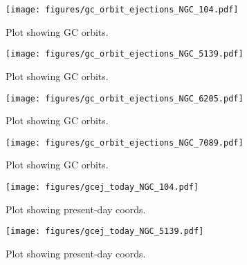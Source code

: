 \documentclass[twocolumn]{aastex631}
\begin{document}
\begin{figure*}
    \begin{centering}
        \texttt{[image: figures/gc\_orbit\_ejections\_NGC\_104.pdf]}
        \caption{
            Plot showing GC orbits.
        }
        \label{fig:gc_orbit_ejections_NGC_104}
    \end{centering}
\end{figure*}

\begin{figure*}
    \begin{centering}
        \texttt{[image: figures/gc\_orbit\_ejections\_NGC\_5139.pdf]}
        \caption{
            Plot showing GC orbits.
        }
        \label{fig:gc_orbit_ejections_NGC_5139}
    \end{centering}
\end{figure*}

\begin{figure*}
    \begin{centering}
        \texttt{[image: figures/gc\_orbit\_ejections\_NGC\_6205.pdf]}
        \caption{
            Plot showing GC orbits.
        }
        \label{fig:gc_orbit_ejections_NGC_6205}
    \end{centering}
\end{figure*}

\begin{figure*}
    \begin{centering}
        \texttt{[image: figures/gc\_orbit\_ejections\_NGC\_7089.pdf]}
        \caption{
            Plot showing GC orbits.
        }
        \label{fig:gc_orbit_ejections_NGC_7089}
    \end{centering}
\end{figure*}

\begin{figure*}
    \begin{centering}
        \texttt{[image: figures/gcej\_today\_NGC\_104.pdf]}
        \caption{
            Plot showing present-day coords.
        }
        \label{fig:gcej_today_NGC_104}
    \end{centering}
\end{figure*}

\begin{figure*}
    \begin{centering}
        \texttt{[image: figures/gcej\_today\_NGC\_5139.pdf]}
        \caption{
            Plot showing present-day coords.
        }
        \label{fig:gcej_today_NGC_5139}
    \end{centering}
\end{figure*}
\end{document}
